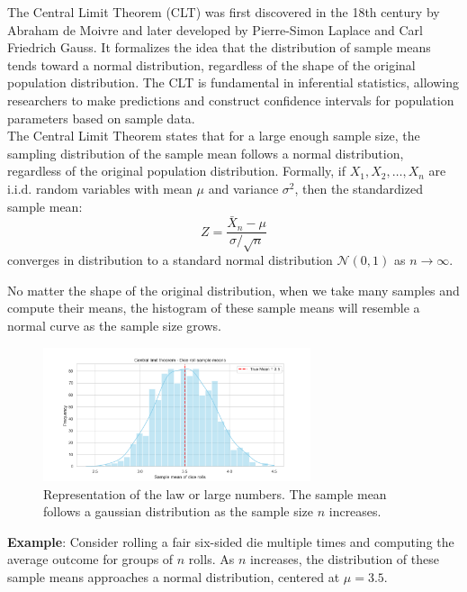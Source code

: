 \documentclass{book}
\begin{document}
The Central Limit Theorem (CLT) was first discovered in the 18th century by Abraham de Moivre and later developed by Pierre-Simon Laplace and Carl Friedrich Gauss. It formalizes the idea that the distribution of sample means tends toward a normal distribution, regardless of the shape of the original population distribution. The CLT is fundamental in inferential statistics, allowing researchers to make predictions and construct confidence intervals for population parameters based on sample data.\\

The Central Limit Theorem states that for a large enough sample size, the sampling distribution of the sample mean follows a normal distribution, regardless of the original population distribution. Formally, if $X_1, X_2, \dots, X_n$ are i.i.d. random variables with mean $\mu$ and variance $\sigma^2$, then the standardized sample mean:
\begin{equation}
    Z = \frac{\bar{X}_n - \mu}{\sigma / \sqrt{n}}
\end{equation}
converges in distribution to a standard normal distribution $\mathcal{N}(0,1)$ as $n \to \infty$.

No matter the shape of the original distribution, when we take many samples and compute their means, the histogram of these sample means will resemble a normal curve as the sample size grows.

\begin{figure}[ht]
    \centering
    \includegraphics[width=0.7\textwidth]{figures/chapter3/central_limit_theorem.png}
    \caption{Representation of the law or large numbers. The sample mean follows a gaussian distribution as the sample size $n$ increases.}
    \label{fig:random}
\end{figure}

\textbf{Example}: Consider rolling a fair six-sided die multiple times and computing the average outcome for groups of $n$ rolls. As $n$ increases, the distribution of these sample means approaches a normal distribution, centered at $\mu=3.5$.\\
\end{document}
